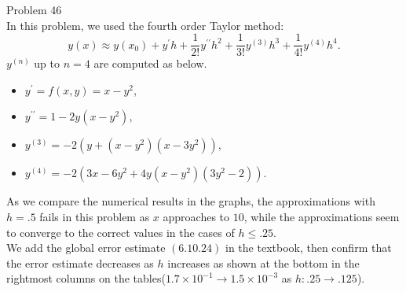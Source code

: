 \documentclass[dvipdfmx]{article}
\begin{document}
Problem 46\\
In this problem, we used the fourth order Taylor method:\\ 
\begin{equation*}
  y(x) \approx y(x_0) + y^{\prime}h + \frac{1}{2!}y^{\prime\prime}h^2
                + \frac{1}{3!}y^{(3)}h^3 + \frac{1}{4!}y^{(4)}h^4.
\end{equation*}
$y^{(n)}$ up to $n = 4$ are computed as below.
\begin{itemize}
  \item $y^{\prime} = f(x,y) = x - y^2$,
  \item $y^{\prime\prime} = 1 - 2y(x-y^2)$,
  \item $y^{(3)} = -2\left( y + (x-y^2)(x-3y^2)\right)$,
  \item $y^{(4)} = -2\left( 3x - 6y^2 + 4y(x-y^2)(3y^2-2)\right)$.
\end{itemize}

As we compare the numerical results in the graphs, the approximations with $h = .5$ fails in this problem as $x$ approaches to $10$, while the approximations seem to  converge to the correct values in the cases of $h \le .25$.\\
We add the global error estimate $(6.10.24)$ in the textbook, then confirm that the error estimate decreases as $h$ increases as shown 
at the bottom in the rightmost columns on the tables($1.7 \times 10^{-1} \to 1.5 \times 10^{-3}$ as $h: .25 \to .125$).
\end{document}
